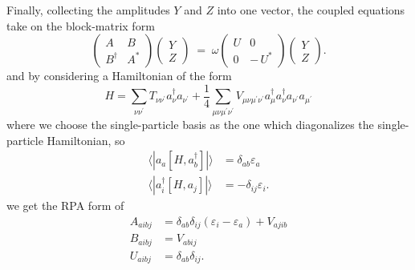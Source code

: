 \noindent Finally, collecting the amplitudes \(Y\) and \(Z\) into one vector,
the coupled equations take on the block-matrix form
\begin{equation}
\begin{pmatrix}
A & B \\[6pt]
B^\dagger & A^*
\end{pmatrix}
\begin{pmatrix}
Y \\ Z
\end{pmatrix}
\;=\;
\omega
\begin{pmatrix}
U & 0 \\[3pt]
0 & -\,U^*
\end{pmatrix}
\begin{pmatrix}
Y \\ Z
\end{pmatrix}.
\label{eq:block_matrix}
\end{equation}
and by considering a Hamiltonian of the form
\begin{equation}
H=\sum_{\nu \nu^{\prime}} T_{\nu \nu^{\prime}} a_\nu^{\dagger} a_{\nu^{\prime}}+\frac{1}{4} \sum_{\mu \nu \mu^{\prime} \nu^{\prime}} V_{\mu \nu \mu^{\prime} \nu^{\prime}} a_\mu^{\dagger} a_\nu^{\dagger} a_{\nu^{\prime}} a_{\mu^{\prime}}
\end{equation}
where we choose the single-particle basis as the one which diagonalizes the single-particle Hamiltonian, so
\begin{align}
\langle | a_a\left[H, a_b^{\dagger}\right]| \rangle & =\delta_{a b} \varepsilon_a \\
\langle | a_i^{\dagger}\left[H, a_j\right]| \rangle & =-\delta_{i j} \varepsilon_i .
\end{align}
we get the RPA form of
\begin{align}
    A_{a i b j} & = \delta_{a b} \delta_{i j}\left(\varepsilon_i-\varepsilon_a\right) + V_{a j i b} \\
    B_{a i b j} & = V_{a b i j} \\
    U_{a i b j} &=  \delta_{a b} \delta_{i j} .
\end{align}
